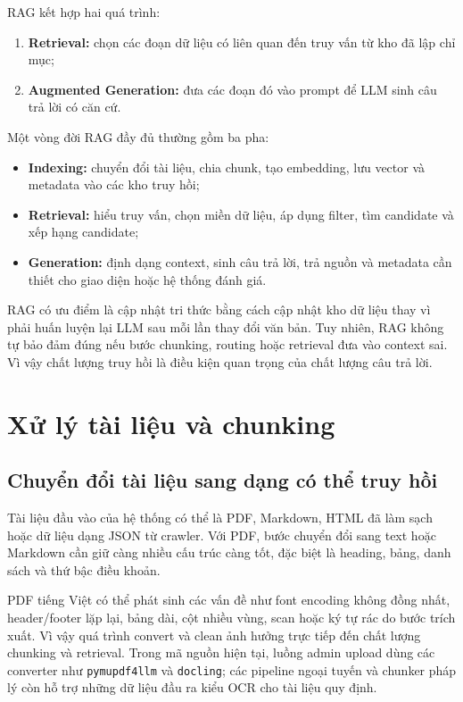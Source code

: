 \documentclass[../DoAn.tex]{subfiles}
\begin{document}
RAG kết hợp hai quá trình:

\begin{enumerate}
    \item \textbf{Retrieval:} chọn các đoạn dữ liệu có liên quan đến truy vấn từ
    kho đã lập chỉ mục;
    \item \textbf{Augmented Generation:} đưa các đoạn đó vào prompt để LLM sinh
    câu trả lời có căn cứ.
\end{enumerate}

Một vòng đời RAG đầy đủ thường gồm ba pha:

\begin{itemize}
    \item \textbf{Indexing:} chuyển đổi tài liệu, chia chunk, tạo embedding, lưu
    vector và metadata vào các kho truy hồi;
    \item \textbf{Retrieval:} hiểu truy vấn, chọn miền dữ liệu, áp dụng filter,
    tìm candidate và xếp hạng candidate;
    \item \textbf{Generation:} định dạng context, sinh câu trả lời, trả nguồn và
    metadata cần thiết cho giao diện hoặc hệ thống đánh giá.
\end{itemize}

RAG có ưu điểm là cập nhật tri thức bằng cách cập nhật kho dữ liệu thay vì phải
huấn luyện lại LLM sau mỗi lần thay đổi văn bản. Tuy nhiên, RAG không tự bảo đảm
đúng nếu bước chunking, routing hoặc retrieval đưa vào context sai. Vì vậy chất
lượng truy hồi là điều kiện quan trọng của chất lượng câu trả lời.

\section{Xử lý tài liệu và chunking}

\subsection{Chuyển đổi tài liệu sang dạng có thể truy hồi}

Tài liệu đầu vào của hệ thống có thể là PDF, Markdown, HTML đã làm sạch hoặc dữ
liệu dạng JSON từ crawler. Với PDF, bước chuyển đổi sang text hoặc Markdown cần
giữ càng nhiều cấu trúc càng tốt, đặc biệt là heading, bảng, danh sách và thứ bậc
điều khoản.

PDF tiếng Việt có thể phát sinh các vấn đề như font encoding không đồng nhất,
header/footer lặp lại, bảng dài, cột nhiều vùng, scan hoặc ký tự rác do bước
trích xuất. Vì vậy quá trình convert và clean ảnh hưởng trực tiếp đến chất lượng
chunking và retrieval. Trong mã nguồn hiện tại, luồng admin upload dùng các
converter như \texttt{pymupdf4llm} và \texttt{docling}; các pipeline ngoại tuyến
và chunker pháp lý còn hỗ trợ những dữ liệu đầu ra kiểu OCR cho tài liệu quy
định.
\end{document}
